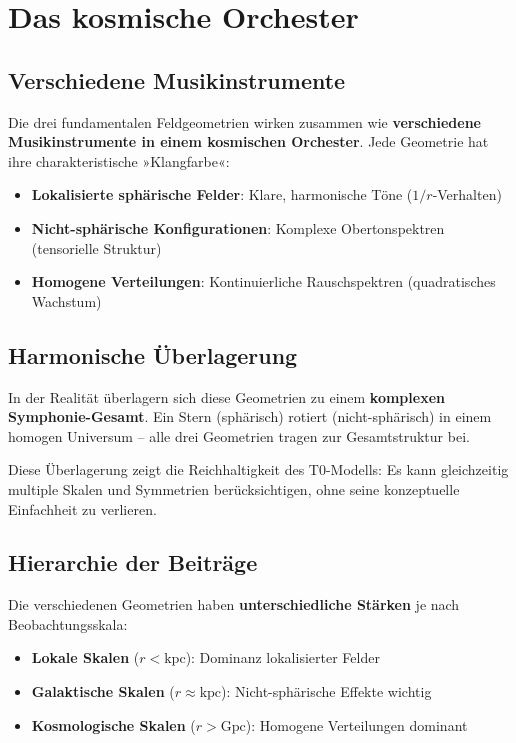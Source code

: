 \documentclass[12pt,a4paper]{report}
\begin{document}
\section{Das kosmische Orchester}

\subsection{Verschiedene Musikinstrumente}

Die drei fundamentalen Feldgeometrien wirken zusammen wie \textbf{verschiedene Musikinstrumente in einem kosmischen Orchester}. Jede Geometrie hat ihre charakteristische »Klangfarbe«:

\begin{itemize}
	\item \textbf{Lokalisierte sphärische Felder}: Klare, harmonische Töne ($1/r$-Verhalten)
	\item \textbf{Nicht-sphärische Konfigurationen}: Komplexe Obertonspektren (tensorielle Struktur)
	\item \textbf{Homogene Verteilungen}: Kontinuierliche Rauschspektren (quadratisches Wachstum)
\end{itemize}

\subsection{Harmonische Überlagerung}

In der Realität überlagern sich diese Geometrien zu einem \textbf{komplexen Symphonie-Gesamt}. Ein Stern (sphärisch) rotiert (nicht-sphärisch) in einem homogen Universum -- alle drei Geometrien tragen zur Gesamtstruktur bei.

Diese Überlagerung zeigt die Reichhaltigkeit des T0-Modells: Es kann gleichzeitig multiple Skalen und Symmetrien berücksichtigen, ohne seine konzeptuelle Einfachheit zu verlieren.

\subsection{Hierarchie der Beiträge}

Die verschiedenen Geometrien haben \textbf{unterschiedliche Stärken} je nach Beobachtungsskala:
\begin{itemize}
	\item \textbf{Lokale Skalen} ($r < \text{kpc}$): Dominanz lokalisierter Felder
	\item \textbf{Galaktische Skalen} ($r \approx \text{kpc}$): Nicht-sphärische Effekte wichtig
	\item \textbf{Kosmologische Skalen} ($r > \text{Gpc}$): Homogene Verteilungen dominant
\end{itemize}
\end{document}
